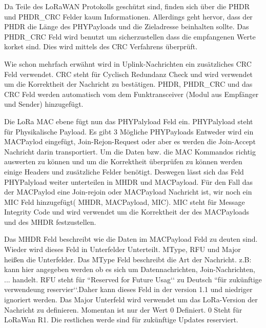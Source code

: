 \documentclass[a4paper,12pt]{article}
\begin{document}
            Da Teile des LoRaWAN Protokolls geschützt sind, finden sich über die PHDR und PHDR\_CRC Felder kaum 
            Informationen. Allerdings geht hervor, dass der PHDR die Länge des PHYPayloads und die Zieladresse 
            beinhalten sollte.
            Das PHDR\_CRC Feld wird benutzt um sicherzustellen dass die empfangenen Werte korket sind. Dies wird  
            mittels des CRC Verfahrens überprüft.
            
            Wie schon mehrfach erwähnt wird in Uplink-Nachrichten ein zusätzliches CRC Feld verwendet. CRC steht für 
            Cyclisch Redundanz Check und wird verwendet um die Korrektheit der Nachricht zu bestätigen. PHDR, PHDR\_CRC 
            und das CRC Feld werden automatisch vom dem Funktransceiver (Modul aus Empfänger und Sender) hinzugefügt.

            Die LoRa MAC ebene fügt nun das PHYPalyload Feld ein. PHYPalyload steht für Physikalische Payload. Es gibt 
            3 Mögliche PHYPayloads Entweder wird ein MACPaylod eingefügt, Join-Rejon-Request oder aber es werden die Join-Accept Nachricht darin transportiert. Um die Daten bzw. die MAC Kommandos richtig auswerten zu können und um die Korrektheit überprüfen zu können werden einige Headers und zusätzliche Felder benötigt. Deswegen lässt sich das Feld PHYPalyload weiter unterteilen in MHDR und MACPayload. Für den Fall das der MACPaylod eine Join-rejoin oder MACPayload Nachricht ist, wir noch ein MIC Feld hinzugefügt( MHDR, MACPayload, MIC). MIC steht für Message Integrity Code und wird verwendet um die Korrektheit der des MACPayloads und des MHDR festzustellen.

            Das MHDR Feld beschreibt wie die Daten im MACPayload Feld zu deuten sind. Wieder wird dieses Feld in 
            Unterfelder Unterteilt. MType, RFU und Major heißen die Unterfelder. Das MType Feld beschreibt die Art der 
            Nachricht. z.B: kann hier angegeben werden ob es sich um Datennachrichten, Join-Nachrichten, ... handelt. 
            RFU steht für ``Reserved for Future Usag‘‘ zu Deutsch ``für zukünftige verwendeung reservier‘‘.Daher kann 
            dieses Feld in der version 1.1 und niedriger ignoriert werden. Das Major Unterfeld wird verwendet um das 
            LoRa-Version der Nachricht zu definieren. Momentan ist nur der Wert 0 Definiert. 0 Steht für LoRaWan R1. 
            Die restlichen werde sind für zukünftige Updates reserviert.
\end{document}
